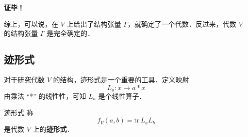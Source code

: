 \textbf{证毕！}

综上，可以说，在 $V$ 上给出了结构张量 $\Gamma$，就确定了一个代数．反过来，代数 $V$ 的结构张量 $\Gamma$ 是完全确定的．
\subsection{迹形式}

对于研究代数 $V$ 的结构，迹形式是一个重要的工具．定义映射
\begin{equation}
L_a:x\rightarrow a*x
\end{equation}
由乘法 “*” 的线性性，可知 $L_a$ 是个线性算子．
\begin{definition}{迹形式}
称
\begin{equation}
f_V(a,b)=\mathrm{tr}\, L_aL_b
\end{equation}
是代数 $V$ 上的\textbf{迹形式}．
\end{definition}
